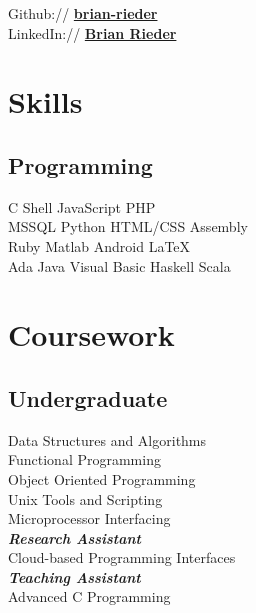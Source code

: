 \documentclass[letterpaper]{deedy-resume} %
\begin{document}
\begin{minipage}[t]{0.33\textwidth}
Github:// \href{https://github.com/brian-rieder}{\bf brian-rieder} \\
LinkedIn:// \href{https://www.linkedin.com/in/debarghyadas}{\bf Brian Rieder} 

\sectionspace %


\section{Skills}

\subsection{Programming}

C \textbullet{} Shell \textbullet{} JavaScript \textbullet{} PHP \\
MSSQL \textbullet{} Python \textbullet{} HTML/CSS \textbullet{} Assembly \\
Ruby \textbullet{} Matlab \textbullet{} Android \textbullet{} \LaTeX\ \\
Ada \textbullet{} Java \textbullet{} Visual Basic \textbullet{} Haskell \textbullet{} Scala

\sectionspace %


\section{Coursework}

\subsection{Undergraduate}

Data Structures and Algorithms \\
Functional Programming \\
Object Oriented Programming \\
Unix Tools and Scripting \\
Microprocessor Interfacing \\
{\footnotesize \textit{\textbf{Research Assistant}}} \\
Cloud-based Programming Interfaces \\
{\footnotesize \textit{\textbf{Teaching Assistant}}} \\
Advanced C Programming


\end{minipage}
\end{document}
